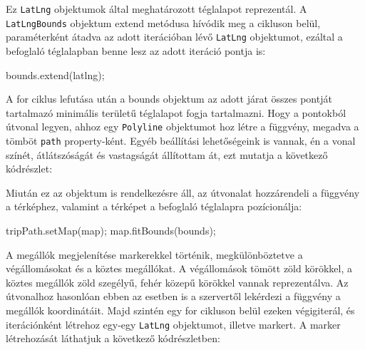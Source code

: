 Ez \texttt{LatLng} objektumok által meghatározott téglalapot reprezentál. A \texttt{LatLngBounds} objektum extend metódusa hívódik meg a cikluson belül, paraméterként átadva az adott iterációban lévő \texttt{LatLng} objektumot, ezáltal a befoglaló téglalapban benne lesz az adott iteráció pontja is:

\begin{cpp}
bounds.extend(latlng);
\end{cpp}

A for ciklus lefutása után a bounds objektum az adott járat összes pontját tartalmazó minimális területű téglalapot fogja tartalmazni.
Hogy a pontokból útvonal legyen, ahhoz egy \texttt{Polyline} objektumot hoz létre a függvény, megadva a tömböt \texttt{path} property-ként. Egyéb beállítási lehetőségeink is vannak, én a vonal színét, átlátszóságát és vastagságát állítottam át, ezt mutatja a következő kódrészlet:


Miután ez az objektum is rendelkezésre áll, az útvonalat hozzárendeli a függvény a térképhez, valamint a térképet a befoglaló téglalapra pozícionálja:

\begin{cpp}
tripPath.setMap(map);
map.fitBounds(bounds);
\end{cpp}

A megállók megjelenítése markerekkel történik, megkülönböztetve a végállomásokat és a köztes megállókat. A végállomások tömött zöld körökkel, a köztes megállók zöld szegélyű, fehér közepű körökkel vannak reprezentálva. Az útvonalhoz hasonlóan ebben az esetben is a szervertől lekérdezi a függvény a megállók koordinátáit. Majd szintén egy for cikluson belül ezeken végigiterál, és iterációnként létrehoz egy-egy \texttt{LatLng} objektumot, illetve markert. A marker létrehozását láthatjuk a következő kódrészletben:


